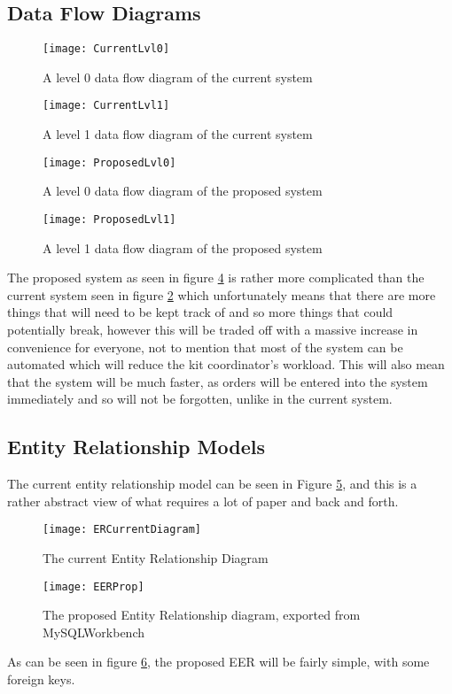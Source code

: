 \documentclass[
11pt, %
a4paper, %
oneside, %
headinclude,footinclude, %
BCOR5mm, %
]{scrartcl}
\begin{document}
\subsection{Data Flow Diagrams}
\begin{figure}[H]
	\centering
	\texttt{[image: CurrentLvl0]}
	\caption{A level 0 data flow diagram of the current system}
	\label{CurrentLvl0}
\end{figure}
\begin{figure}[H]
	\centering
	\texttt{[image: CurrentLvl1]}
	\caption{A level 1 data flow diagram of the current system}
	\label{CurrentLvl1}
\end{figure}
\begin{figure}[H]
	\centering
	\texttt{[image: ProposedLvl0]}
	\caption{A level 0 data flow diagram of the proposed system}
	\label{ProposedLvl0}
\end{figure}
\begin{figure}[H]
	\centering
	\texttt{[image: ProposedLvl1]}
	\caption{A level 1 data flow diagram of the proposed system}
	\label{ProposedLvl1}
\end{figure}
The proposed system as seen in figure \ref{ProposedLvl1} is rather more complicated than the current system seen in figure \ref{CurrentLvl1} which unfortunately means that there are more things that will need to be kept track of and so more things that could potentially break, however this will be traded off with a massive increase in convenience for everyone, not to mention that most of the system can be automated which will reduce the kit coordinator's workload. This will also mean that the system will be much faster, as orders will be entered into the system immediately and so will not be forgotten, unlike in the current system.

\subsection{Entity Relationship Models}
The current entity relationship model can be seen in Figure \ref{CurEER}, and this is a rather abstract view of what requires a lot of paper and back and forth.
\begin{figure}[H]
	\centering\texttt{[image: ERCurrentDiagram]}
	\caption{The current Entity Relationship Diagram}
	\label{CurEER}	
\end{figure}

\begin{figure}[H]
	\centering\texttt{[image: EERProp]}
	\caption{The proposed Entity Relationship diagram, exported from MySQLWorkbench}
	\label{PropEER}	
\end{figure}
As can be seen in figure \ref{PropEER}, the proposed EER will be fairly simple, with some foreign keys.
\end{document}
